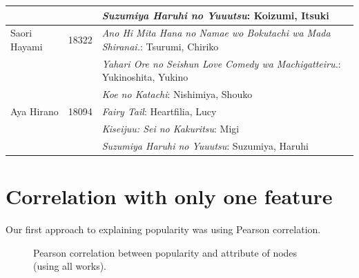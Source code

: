 \begin{table}[!h]
\begin{center}
\begin{tabular}{|l|c|l|}
		 & & \textit{Suzumiya Haruhi no Yuuutsu}: Koizumi, Itsuki \\ 
		\hline
		Saori Hayami & 18322 & \textit{Ano Hi Mita Hana no Namae wo Bokutachi wa Mada Shiranai.}: Tsurumi, Chiriko \\ 
		 & & \textit{Yahari Ore no Seishun Love Comedy wa Machigatteiru.}: Yukinoshita, Yukino \\ 
		 & & \textit{Koe no Katachi}: Nishimiya, Shouko \\
		\hline
		Aya Hirano & 18094 & \textit{Fairy Tail}: Heartfilia, Lucy \\ 
		 & & \textit{Kiseijuu: Sei no Kakuritsu}: Migi \\ 
		 & & \textit{Suzumiya Haruhi no Yuuutsu}: Suzumiya, Haruhi \\
		\hline
	\end{tabular}
	\end{center}
\end{table}

\newpage
\section{Correlation with only one feature}
Our first approach to explaining popularity was using Pearson correlation.

\begin{figure}[!h]
	\begin{flushleft}
	\caption{Pearson correlation between popularity and attribute of nodes (using all works).}
	\label{fig:pearsonCorrAllWorks}
	\end{flushleft}
\end{figure}

